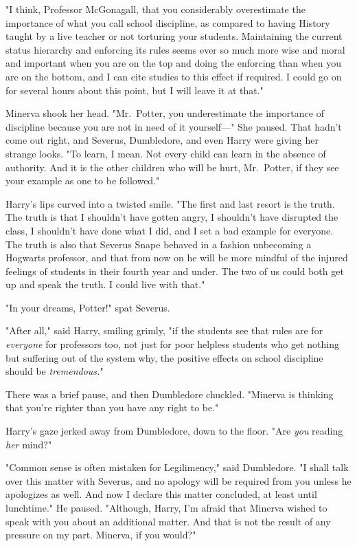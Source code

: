 "I think, Professor McGonagall, that you considerably overestimate the
importance of what you call school discipline, as compared to having History
taught by a live teacher or not torturing your students. Maintaining the
current status hierarchy and enforcing its rules seems ever so much more wise
and moral and important when you are on the top and doing the enforcing than
when you are on the bottom, and I can cite studies to this effect if required.
I could go on for several hours about this point, but I will leave it at that."

Minerva shook her head. "Mr.~Potter, you underestimate the importance of
discipline because you are not in need of it yourself\mbox{---}" She paused. That
hadn't come out right, and Severus, Dumbledore, and even Harry were giving her
strange looks. "To learn, I mean. Not every child can learn in the absence of
authority. And it is the other children who will be hurt, Mr.~Potter, if they
see your example as one to be followed."

Harry's lips curved into a twisted smile. "The first and last resort is the
truth. The truth is that I shouldn't have gotten angry, I shouldn't have
disrupted the class, I shouldn't have done what I did, and I set a bad example
for everyone. The truth is also that Severus Snape behaved in a fashion
unbecoming a Hogwarts professor, and that from now on he will be more mindful
of the injured feelings of students in their fourth year and under. The two of
us could both get up and speak the truth. I could live with that."

"In your dreams, Potter!" spat Severus.

"After all," said Harry, smiling grimly, "if the students see that rules are
for \emph{everyone{\el}} for professors too, not just for poor helpless
students who get nothing but suffering out of the system{\el} why, the
positive effects on school discipline should be \emph{tremendous.}"

There was a brief pause, and then Dumbledore chuckled. "Minerva is thinking
that you're righter than you have any right to be."

Harry's gaze jerked away from Dumbledore, down to the floor. "Are \emph{you}
reading \emph{her} mind?"

"Common sense is often mistaken for Legilimency," said Dumbledore. "I shall
talk over this matter with Severus, and no apology will be required from you
unless he apologizes as well. And now I declare this matter concluded, at least
until lunchtime." He paused. "Although, Harry, I'm afraid that Minerva wished
to speak with you about an additional matter. And that is not the result of any
pressure on my part. Minerva, if you would?"

